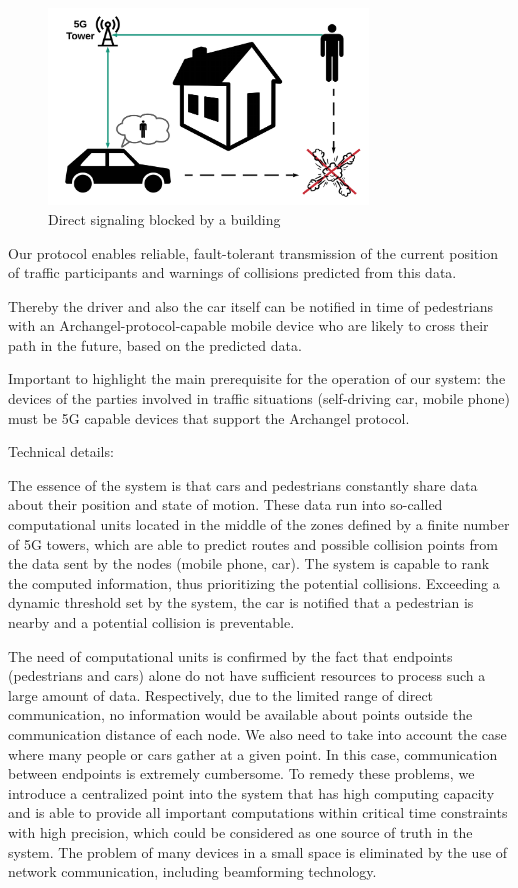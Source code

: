 \documentclass[conference]{IEEEtran}
\begin{document}
\begin{figure}[h]
    \centering
    \includegraphics[width=8.5cm]{./pics/Corner.png}
    \caption{Direct signaling blocked by a building}
\end{figure}

Our protocol enables reliable, fault-tolerant transmission of the current position of traffic participants and warnings of collisions predicted from this data.

Thereby the driver and also the car itself can be notified in time of pedestrians with an Archangel-protocol-capable mobile device who are likely to cross their path in the future, based on the predicted data.

Important to highlight the main prerequisite for the operation of our system: the devices of the parties involved in traffic situations (self-driving car, mobile phone) must be 5G capable devices that support the Archangel protocol.

Technical details:

The essence of the system is that cars and pedestrians constantly share data about their position and state of motion. These data run into so-called computational units located in the middle of the zones defined by a finite number of 5G towers, which are able to predict routes and possible collision points from the data sent by the nodes (mobile phone, car). The system is capable to rank the computed information, thus prioritizing the potential collisions. Exceeding a dynamic threshold set by the system, the car is notified that a pedestrian is nearby and a potential collision is preventable.

The need of computational units is confirmed by the fact that endpoints (pedestrians and cars) alone do not have sufficient resources to process such a large amount of data. Respectively, due to the limited range of direct communication, no information would be available about points outside the communication distance of each node. We also need to take into account the case where many people or cars gather at a given point. In this case, communication between endpoints is extremely cumbersome. To remedy these problems, we introduce a centralized point into the system that has high computing capacity and is able to provide all important computations within critical time constraints with high precision, which could be considered as one source of truth in the system. The problem of many devices in a small space is eliminated by the use of network communication, including beamforming technology.
\end{document}
